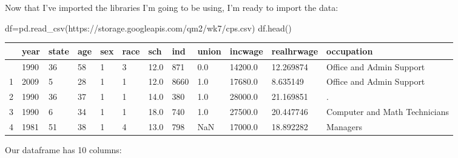 \documentclass[
  letterpaper,
  DIV=11,
  numbers=noendperiod]{scrreprt}
\newenvironment{Shaded}{\begin{snugshade}}{\end{snugshade}}
\newcommand{\NormalTok}[1]{\textcolor[rgb]{0.00,0.23,0.31}{#1}}
\newcommand{\OperatorTok}[1]{\textcolor[rgb]{0.37,0.37,0.37}{#1}}
\newcommand{\StringTok}[1]{\textcolor[rgb]{0.13,0.47,0.30}{#1}}
\begin{document}
Now that I've imported the libraries I'm going to be using, I'm ready to
import the data:

\begin{Shaded}
\begin{Highlighting}[]
\NormalTok{df}\OperatorTok{=}\NormalTok{pd.read\_csv(}\StringTok{\textquotesingle{}https://storage.googleapis.com/qm2/wk7/cps.csv\textquotesingle{}}\NormalTok{)}
\NormalTok{df.head()}
\end{Highlighting}
\end{Shaded}

\begin{longtable}[]{@{}llllllllllll@{}}
\toprule\noalign{}
& year & state & age & sex & race & sch & ind & union & incwage &
realhrwage & occupation \\
\midrule\noalign{}
\endhead
\bottomrule\noalign{}
\endlastfoot
0 & 1990 & 36 & 58 & 1 & 3 & 12.0 & 871 & 0.0 & 14200.0 & 12.269874 &
Office and Admin Support \\
1 & 2009 & 5 & 28 & 1 & 1 & 12.0 & 8660 & 1.0 & 17680.0 & 8.635149 &
Office and Admin Support \\
2 & 1990 & 36 & 37 & 1 & 1 & 14.0 & 380 & 1.0 & 28000.0 & 21.169851 &
. \\
3 & 1990 & 6 & 34 & 1 & 1 & 18.0 & 740 & 1.0 & 27500.0 & 20.447746 &
Computer and Math Technicians \\
4 & 1981 & 51 & 38 & 1 & 4 & 13.0 & 798 & NaN & 17000.0 & 18.892282 &
Managers \\
\end{longtable}

Our dataframe has 10 columns:
\end{document}
